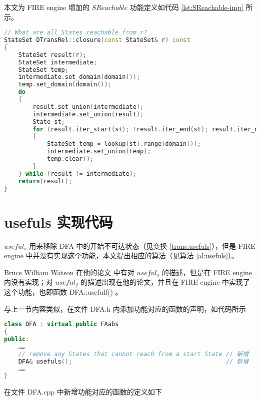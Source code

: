 本文为 FIRE engine 增加的 $SReachable$ 功能定义如代码 \ref{lst:SReachable-imp} 所示。

\lstset{style=mystyle}
\begin{lstlisting}[language=C++,label={lst:SReachable-imp},caption={文件 DTransRel.cpp}]
// What are all States reachable from r?
StateSet DTransRel::closure(const StateSet& r) const
{
    StateSet result(r);
    StateSet intermediate;
    StateSet temp;
    intermediate.set_domain(domain());
    temp.set_domain(domain());
    do
    {
        result.set_union(intermediate);
        intermediate.set_union(result);
        State st;
        for (result.iter_start(st); !result.iter_end(st); result.iter_next(st))
        {
            StateSet temp = lookup(st).range(domain());
            intermediate.set_union(temp);
            temp.clear();
        }
    } while (result != intermediate);
    return(result);
}
\end{lstlisting}

\section{usefuls 实现代码}\label{sec:usefuls-imp}

$useful_s$ 用来移除 DFA 中的开始不可达状态（见变换 \ref{trans:usefuls}），但是 FIRE engine 中并没有实现这个功能，本文提出相应的算法（见算法 \ref{al:usefuls}）。

\begin{remark}
    Bruce William Watson 在他的论文 \cite{watson1993taxonomyb} 中有对 $useful_s$ 的描述，但是在 FIRE engine 内没有实现；对 $useful_f$ 的描述出现在他的论文\cite[注释 2.39]{watson1993taxonomya}，并且在 FIRE engine 中实现了这个功能，也即函数 DFA::usefulf() 。
\end{remark}

与上一节内容类似，在文件 DFA.h 内添加功能对应的函数的声明，如代码所示

\begin{lstlisting}[language=C++,label={lst:usefuls-def},caption={文件 DFA.h}]
class DFA : virtual public FAabs
{
public:
    ……
    // remove any States that cannot reach from a start State // 新增
	DFA& usefuls();                                           // 新增
    ……
}
\end{lstlisting}

在文件 DFA.cpp 中新增功能对应的函数的定义如下

